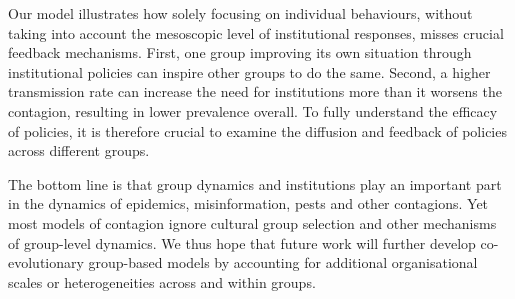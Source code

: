 Our model illustrates how solely focusing on individual behaviours, without taking into account the mesoscopic level of institutional responses, misses crucial feedback mechanisms. First, one group improving its own situation through institutional policies can inspire other groups to do the same. Second, a higher transmission rate can increase the need for institutions more than it worsens the contagion, resulting in lower prevalence overall. To fully understand the efficacy of policies, it is therefore crucial to examine the diffusion and feedback of policies across different groups. 

The bottom line is that group dynamics and institutions play an important part in the dynamics of epidemics, misinformation, pests and other contagions. Yet most models of contagion ignore cultural group selection and other mechanisms of group-level dynamics. We thus hope that future work will further develop co-evolutionary group-based models by accounting for additional organisational scales or heterogeneities across and within groups.

\begingroup
{}
\putbib
\endgroup